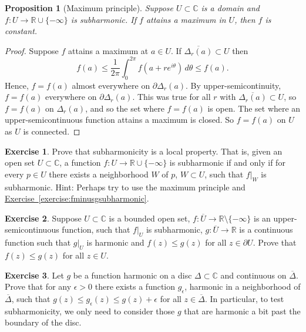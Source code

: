 \documentclass[12pt,openany]{book}
\newcommand{\C}{{\mathbb{C}}}
\newcommand{\R}{{\mathbb{R}}}
\theoremstyle{plain}
\newtheorem{prop}[thm]{Proposition}
\theoremstyle{remark}
\theoremstyle{definition}
\newenvironment{exbox}{%
    \def\FrameCommand{\vrule width 1pt \relax\hspace {10pt}}%
    \MakeFramed {\advance \hsize -\width \FrameRestore }%
}{%
    \endMakeFramed
}
\theoremstyle{exercise}
\newtheorem{exercise}{Exercise}[section]
\theoremstyle{example}
\newcommand{\exerciseref}[1]{\hyperref[#1]{Exercise~\ref*{#1}}}
\begin{document}
\begin{prop}[Maximum principle]
Suppose $U \subset \C$ is a domain and $f \colon U \to \R \cup \{ -\infty \}$
is subharmonic.  If $f$ attains a maximum in $U$, then $f$ is constant.
\end{prop}

\begin{proof}
Suppose $f$ attains a maximum at $a \in U$.
If
$\overline{\Delta_r(a)} \subset U$ then
\begin{equation*}
f(a) \leq \frac{1}{2\pi} \int_0^{2\pi} f(a+re^{i\theta})\, d\theta \leq f(a)
.
\end{equation*}
Hence, $f = f(a)$ almost everywhere on $\partial \Delta_r(a)$.
By upper-semicontinuity, $f = f(a)$ everywhere on $\partial \Delta_r(a)$.
This was true for all $r$
with $\overline{\Delta_r(a)} \subset U$, so $f=f(a)$ on $\Delta_r(a)$,
and so the set where $f=f(a)$ is open.  The set where an upper-semicontinuous
function attains a maximum is closed.  So $f=f(a)$ on $U$ as $U$ is
connected.
\end{proof}

\begin{exbox}
\begin{exercise}
Prove that subharmonicity is a local property.  That is, given an open set
$U \subset \C$, a function $f \colon U \to \R \cup \{ -\infty \}$ is subharmonic if
and only if for every $p \in U$ there exists a neighborhood $W$ of $p$,
$W \subset U$, such that $f|_{W}$ is subharmonic.  Hint: Perhaps try to use
the maximum principle and \exerciseref{exercise:fminusgsubharmonic}.
\end{exercise}

\begin{exercise}
Suppose $U \subset \C$ is a bounded open set, $f \colon \overline{U} \to \R
\setminus \{-\infty\}$ is an upper-semicontinuous function, such that $f|_U$
is subharmonic, $g \colon \overline{U} \to \R$ is a continuous function
such that $g|_U$ is harmonic and
$f(z) \leq g(z)$ for all $z \in \partial U$.  Prove that
$f(z) \leq g(z)$ for all $z \in U$.
\end{exercise}

\begin{exercise} \label{exercise:onlyniceuneededforsubharmonic}
Let $g$ be a function
harmonic on a disc $\Delta \subset \C$ and continuous on
$\overline{\Delta}$.  Prove that for any $\epsilon > 0$ there exists
a function $g_\epsilon$, harmonic in a neighborhood of $\overline{\Delta}$,
such that $g(z) \leq g_\epsilon(z) \leq g(z)+\epsilon$ for all $z \in
\overline{\Delta}$.
In particular, to test subharmonicity, we only need to consider those
$g$ that are harmonic a bit past the boundary of the disc.
\end{exercise}
\end{exbox}
\end{document}
